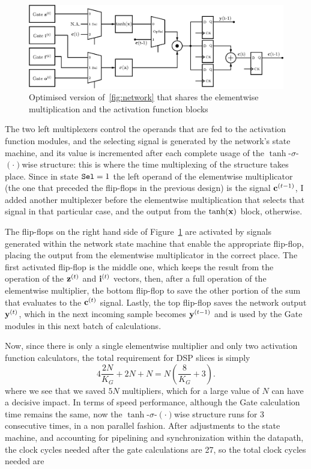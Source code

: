 \begin{figure}
    \centering
    \includegraphics[width=0.9\linewidth]{figures/network-opt.eps}
    \caption[Optimised version of~\ref{fig:network} that shares the elementwise multiplication and the activation function blocks]{Optimised version of~\ref{fig:network} that shares the elementwise multiplication and the activation function blocks}
    \label{fig:network-opt}
\end{figure}
The two left multiplexers control the operands that are fed to the activation function modules, and the selecting signal is generated by the network's state machine, and its value is incremented after each complete usage of the $\tanh$-$\sigma$-$(\cdot)$wise  structure: this is where the time multiplexing of the structure takes place. Since in state $\verb+Sel+=1$ the left operand of the elementwise multiplicator (the one that preceded the flip-flops in the previous design) is the signal $\mathbf{c}^{(t-1)}$, I added another multiplexer before the elementwise multiplication that selects that signal in that particular case, and the output from the $\tanh(\mathbf{x})$ block, otherwise.

The flip-flops on the right hand side of Figure~\ref{fig:network-opt} are activated by signals generated within the network state machine that enable the appropriate flip-flop, placing the output from the elementwise multiplicator in the correct place. The first activated flip-flop is the middle one, which keeps the result from the operation of the $\mathbf{z}^{(t)}$ and $\mathbf{i}^{(t)}$ vectors, then, after a full operation of the elementwise multiplier, the bottom flip-flop to save the other portion of the sum that evaluates to the $\mathbf{c}^{(t)}$ signal. Lastly, the top flip-flop saves the network output $\mathbf{y}^{(t)}$, which in the next incoming sample becomes $\mathbf{y}^{(t-1)}$ and is used by the Gate modules in this next batch of calculations.

Now, since there is only a single elementwise multiplier and only two activation function calculators, the total requirement for DSP slices is simply
\begin{equation}\label{eq:numdsp_network-opt}
    4\frac{2N}{K_G} + 2N + N = N \left( \frac{8}{K_G} + 3 \right).
\end{equation}
where we see that we saved $5N$ multipliers, which for a large value of $N$ can have a decisive impact. In terms of speed performance, although the Gate calculation time remains the same, now the $\tanh$-$\sigma$-$(\cdot)$wise structure runs for 3 consecutive times, in a non parallel fashion. After adjustments to the state machine, and accounting for pipelining and synchronization within the datapath, the clock cycles needed after the gate calculations are 27, so the total clock cycles needed are 


